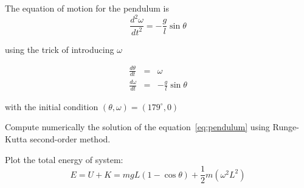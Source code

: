 \documentclass[10pt]{article}
\begin{document}
The equation of motion for the pendulum is
%
\begin{equation}\label{eq:pendulum}
\frac{d^2\omega}{dt^2} = - \frac{g}{l} \sin \theta
\end{equation}

using the trick of introducing $\omega$

\begin{eqnarray}
\frac{d\theta}{dt} & = & \omega \\ 
\frac{d\omega}{dt} & = & -\frac{g}{l} \sin \theta
\end{eqnarray}

with the initial condition $(\theta, \omega) = (179^\circ, 0)$

\begin{question}
Compute numerically the solution of the equation~\ref{eq:pendulum} using Runge-Kutta second-order method.
\end{question}

\begin{question}
Plot the total energy of system:
%
\begin{equation}
E = U + K = m g L (1 - \cos \theta) + \frac{1}{2} m (\omega^2 L^2) 
\end{equation}
\end{question}
\end{document}
